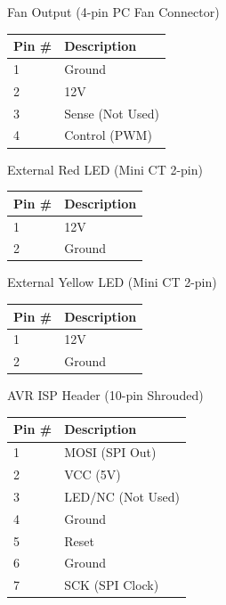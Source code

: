 \documentclass{article}
\begin{document}
\begin{description}[itemsep = 18pt]
  \item[CON5:] Fan Output (4-pin PC Fan Connector)
    \begin{center}
        \begin{tabular}{l|l}
            Pin \# & Description \\
            \hline
            1 & Ground \\
            2 & 12V \\
            3 & Sense (Not Used) \\
            4 & Control (PWM) \\
        \end{tabular}
    \end{center}
  \item[CON6:] External Red LED (Mini CT 2-pin)
    \begin{center}
        \begin{tabular}{l|l}
            Pin \# & Description \\
            \hline
            1 & 12V \\
            2 & Ground \\
        \end{tabular}
    \end{center}
  \item[CON7:] External Yellow LED (Mini CT 2-pin)
    \begin{center}
        \begin{tabular}{l|l}
            Pin \# & Description \\
            \hline
            1 & 12V \\
            2 & Ground \\
        \end{tabular}
    \end{center}
  \item[CON8:] AVR ISP Header (10-pin Shrouded)
    \begin{center}
        \begin{tabular}{l|l}
            Pin \# & Description \\
            \hline
            1  & MOSI (SPI Out) \\
            2  & VCC (5V) \\
            3  & LED/NC (Not Used) \\
            4  & Ground \\
            5  & Reset \\
            6  & Ground \\
            7  & SCK (SPI Clock) \\

\end{tabular}
\end{center}
\end{description}
\end{document}
